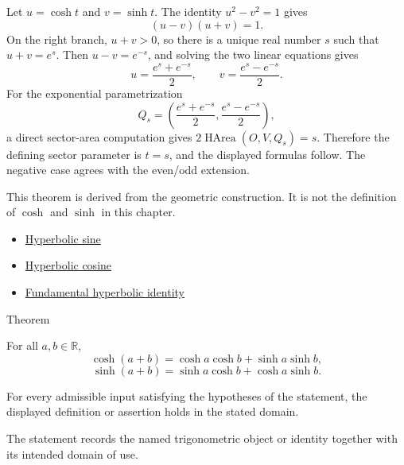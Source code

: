 \begin{remark*}[Proof]
Let $u=\cosh t$ and $v=\sinh t$. The identity $u^2-v^2=1$ gives
\[
  (u-v)(u+v)=1.
\]
On the right branch, $u+v>0$, so there is a unique real number $s$ such that
$u+v=e^s$. Then $u-v=e^{-s}$, and solving the two linear equations gives
\[
  u=\frac{e^s+e^{-s}}{2},
  \qquad
  v=\frac{e^s-e^{-s}}{2}.
\]
For the exponential parametrization
\[
  Q_s=\left(\frac{e^s+e^{-s}}{2},\frac{e^s-e^{-s}}{2}\right),
\]
a direct sector-area computation gives
$2\operatorname{HArea}(O,V,Q_s)=s$. Therefore the defining sector parameter is
$t=s$, and the displayed formulas follow. The negative case agrees with the
even/odd extension.
\end{remark*}
\begin{remark*}
This theorem is derived from the geometric construction. It is not the
definition of $\cosh$ and $\sinh$ in this chapter.
\end{remark*}
\begin{dependencies}
\begin{itemize}
  \item \hyperref[def:hyperbolic-sine]{Hyperbolic sine}
  \item \hyperref[def:hyperbolic-cosine]{Hyperbolic cosine}
  \item \hyperref[thm:fundamental-hyperbolic-identity]{Fundamental hyperbolic identity}
\end{itemize}
\end{dependencies}

\begin{theorembox}{Theorem}
\begin{theorem}
\label{thm:hyperbolic-sum-formulas}
For all $a,b\in\mathbb{R}$,
\[
  \cosh(a+b)=\cosh a\cosh b+\sinh a\sinh b,
\]
\[
  \sinh(a+b)=\sinh a\cosh b+\cosh a\sinh b.
\]
\end{theorem}
\end{theorembox}
\begin{remark*}
For every admissible input satisfying the hypotheses of the statement, the
displayed definition or assertion holds in the stated domain.
\end{remark*}

\begin{remark*}[Interpretation]
The statement records the named trigonometric object or identity together with
its intended domain of use.
\end{remark*}


